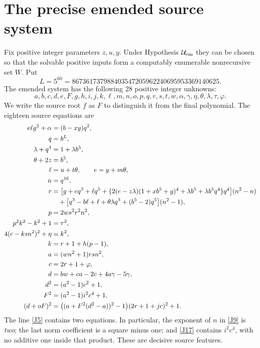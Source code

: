 \documentclass[11pt]{article}
\begin{document}
\section{The precise emended source system}
Fix positive integer parameters \(z,u,y\). Under Hypothesis
$\mathcal U_{\rm em}$ they can be chosen so that the solvable positive
inputs form a computably enumerable nonrecursive set \(W\). Put
\[
 L=5^{60}=867361737988403547205962240695953369140625.
\]
The emended system has the following 28 positive integer unknowns:
\[
 a,b,c,d,e,F,g,h,i,j,k,\ell,m,n,o,p,q,r,s,t,w,
 \alpha,\gamma,\eta,\theta,\lambda,\tau,\varphi.
\]
We write the source root \(f\) as \(F\) to distinguish it from the final
polynomial. The eighteen source equations are
\begin{align}
 e\ell g^2+\alpha&=(b-xy)q^2,\label{J1}\\
 q&=b^L,\label{J2}\\
 \lambda+q^4&=1+\lambda b^5,\label{J3}\\
 \theta+2z&=b^5,\label{J4}\\
 \ell&=u+t\theta,\qquad e=y+m\theta,\label{J5}\\
 n&=q^{16},\label{J7}\\
 r&=\bigl[g+eq^3+\ell q^5+
     \{2(e-z\lambda)(1+xb^5+g)^4+\lambda b^5+
          \lambda b^5q^4\}q^4\bigr](n^2-n)\notag\\
 &\quad+\bigl[q^3-b\ell+\ell+\theta\lambda q^3+
                    (b^5-2)q^5\bigr](n^2-1),\label{J8}\\
 p&=2ws^2r^2n^2,\label{J9}\\
 p^2k^2-k^2+1&=\tau^2,\label{J10}\\
 4(c-ksn^2)^2+\eta&=k^2,\label{J11}\\
 k&=r+1+h(p-1),\label{J12}\\
 a&=(wn^2+1)rsn^2,\label{J13}\\
 c&=2r+1+\varphi,\label{J14}\\
 d&=bw+ca-2c+4a\gamma-5\gamma,\label{J15}\\
 d^2&=(a^2-1)c^2+1,\label{J16}\\
 F^2&=(a^2-1)i^2c^4+1,\label{J17}\\
 (d+oF)^2&=\bigl((a+F^2(d^2-a))^2-1\bigr)
                      (2r+1+jc)^2+1.\label{J18}
\end{align}
The line \eqref{J5} contains two equations. In particular, the exponent
of \(n\) in \eqref{J9} is \emph{two}; the last norm coefficient is a
square minus one; and \eqref{J17} contains \(i^2c^4\), with no additive
one inside that product. These are decisive source features.
\end{document}
